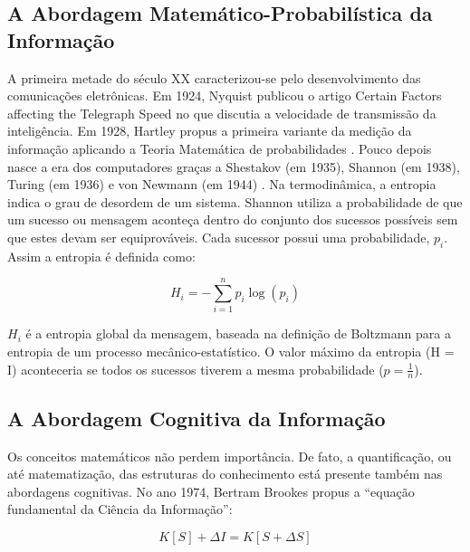\documentclass[a4paper,11pt]{article}
\begin{document}
\subsection{A Abordagem Matemático-Probabilística da Informação}

A primeira metade do século XX caracterizou-se pelo desenvolvimento das
comunicações eletrônicas. Em 1924, Nyquist publicou o artigo Certain Factors affecting the
Telegraph Speed no que discutia a velocidade de transmissão da inteligência. Em 1928, Hartley
propus a primeira variante da medição da informação aplicando a Teoria Matemática de
probabilidades \cite{sok} .
Pouco depois nasce a era dos
computadores graças a Shestakov (em 1935), Shannon (em 1938), Turing (em 1936) e von
Newmann (em 1944) \cite{berr}.
Na termodinâmica, a entropia indica o grau de desordem de um sistema. Shannon
utiliza a probabilidade de que um sucesso ou mensagem aconteça dentro do conjunto dos
sucessos possíveis sem que estes devam ser equiprováveis. Cada sucessor possui uma
probabilidade, $p_{i}$. Assim a entropia é definida como: 

\begin{equation}
H_{i} = - \sum_{i=1}^{n} p_{i} \log(p_{i})
\label{eq:equ1}
\end{equation}

$H_{i}$ é a entropia global da mensagem, baseada na definição de Boltzmann para a entropia de um processo mecânico-estatístico. O valor máximo da entropia (H = I) aconteceria se todos os sucessos tiverem a mesma probabilidade ($p = \frac{1}{n}$).

\subsection{A Abordagem Cognitiva da Informação}


Os conceitos matemáticos não perdem importância. De fato, a quantificação, ou até matematização, das estruturas do conhecimento está presente também nas abordagens cognitivas. No ano 1974, Bertram Brookes propus a “equação fundamental da Ciência da Informação”:

\begin{equation}
K[S] + \Delta I = K[S + \Delta S]
\label{eq:equ2}
\end{equation}
\end{document}
